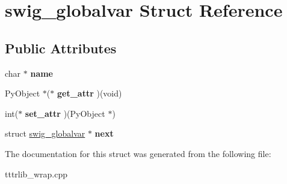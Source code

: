 \hypertarget{structswig__globalvar}{}\section{swig\+\_\+globalvar Struct Reference}
\label{structswig__globalvar}
\subsection*{Public Attributes}
\begin{DoxyCompactItemize}
\item 
\mbox{\label{structswig__globalvar_a32fcb5efb741f97e5c53e1a253cafdd9}} 
char $\ast$ {\bfseries name}
\item 
\mbox{\label{structswig__globalvar_ab617d0ca02f7660a9e5fd31dceaf6475}} 
Py\+Object $\ast$($\ast$ {\bfseries get\+\_\+attr} )(void)
\item 
\mbox{\label{structswig__globalvar_acff619325c0e354df88508d64c1608e6}} 
int($\ast$ {\bfseries set\+\_\+attr} )(Py\+Object $\ast$)
\item 
\mbox{\label{structswig__globalvar_a6b7f8fdec3a5c39a52b33c916d7ba028}} 
struct \hyperlink{structswig__globalvar}{swig\+\_\+globalvar} $\ast$ {\bfseries next}
\end{DoxyCompactItemize}


The documentation for this struct was generated from the following file\+:\begin{DoxyCompactItemize}
\item 
tttrlib\+\_\+wrap.\+cpp\end{DoxyCompactItemize}
